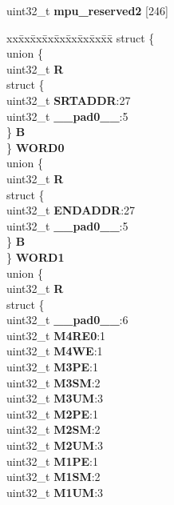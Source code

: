 \begin{DoxyCompactItemize}
\begin{tabbing}
\end{tabbing}\item 
\mbox{\label{structMPU__tag_a6d780b98ac69f29eb695898ed31d932c}} 
uint32\+\_\+t {\bfseries mpu\+\_\+reserved2} \mbox{[}246\mbox{]}
\item 
\mbox{\label{structMPU__tag_a178381b9077eee424d9237c681547885}} 
\begin{tabbing}
xx\=xx\=xx\=xx\=xx\=xx\=xx\=xx\=xx\=\kill
struct \{\\
\>union \{\\
\>\>uint32\_t {\bfseries R}\\
\>\>struct \{\\
\>\>\>uint32\_t {\bfseries SRTADDR}:27\\
\>\>\>uint32\_t {\bfseries \_\_pad0\_\_}:5\\
\>\>\} {\bfseries B}\\
\>\} {\bfseries WORD0}\\
\>union \{\\
\>\>uint32\_t {\bfseries R}\\
\>\>struct \{\\
\>\>\>uint32\_t {\bfseries ENDADDR}:27\\
\>\>\>uint32\_t {\bfseries \_\_pad0\_\_}:5\\
\>\>\} {\bfseries B}\\
\>\} {\bfseries WORD1}\\
\>union \{\\
\>\>uint32\_t {\bfseries R}\\
\>\>struct \{\\
\>\>\>uint32\_t {\bfseries \_\_pad0\_\_}:6\\
\>\>\>uint32\_t {\bfseries M4RE0}:1\\
\>\>\>uint32\_t {\bfseries M4WE}:1\\
\>\>\>uint32\_t {\bfseries M3PE}:1\\
\>\>\>uint32\_t {\bfseries M3SM}:2\\
\>\>\>uint32\_t {\bfseries M3UM}:3\\
\>\>\>uint32\_t {\bfseries M2PE}:1\\
\>\>\>uint32\_t {\bfseries M2SM}:2\\
\>\>\>uint32\_t {\bfseries M2UM}:3\\
\>\>\>uint32\_t {\bfseries M1PE}:1\\
\>\>\>uint32\_t {\bfseries M1SM}:2\\
\>\>\>uint32\_t {\bfseries M1UM}:3\\

\end{tabbing}
\end{DoxyCompactItemize}
